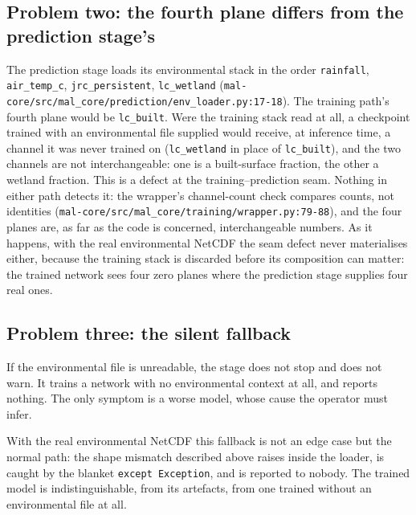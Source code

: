\documentclass[11pt,a4paper]{article}
\newcommand{\codex}[1]{\texttt{#1}}
\begin{document}
\subsection{Problem two: the fourth plane differs from the prediction stage's}

The prediction stage loads its environmental stack in the order
\codex{rainfall}, \codex{air\_\allowbreak{}temp\_\allowbreak{}c}, \codex{jrc\_\allowbreak{}persistent},
\codex{lc\_\allowbreak{}wetland}
(\codex{mal-core/\allowbreak{}src/\allowbreak{}mal\_\allowbreak{}core/\allowbreak{}prediction/\allowbreak{}env\_\allowbreak{}loader.py:17-18}). The training
path's fourth plane would be \codex{lc\_\allowbreak{}built}. Were the training stack read
at all, a checkpoint trained with an environmental file supplied would
receive, at inference time, a channel it was never trained on
(\codex{lc\_\allowbreak{}wetland} in place of \codex{lc\_\allowbreak{}built}), and the two
channels are not interchangeable: one is a built-surface fraction, the
other a wetland fraction. This is a defect at the training--prediction seam.
Nothing in either path detects it: the wrapper's channel-count check compares
counts, not identities (\codex{mal-core/\allowbreak{}src/\allowbreak{}mal\_\allowbreak{}core/\allowbreak{}training/\allowbreak{}wrapper.py:79-88}),
and the four planes are, as far as the code is concerned, interchangeable
numbers. As it happens, with the real environmental NetCDF the seam defect
never materialises either, because the training stack is discarded before
its composition can matter: the trained network sees four zero planes where
the prediction stage supplies four real ones.

\subsection{Problem three: the silent fallback}

If the environmental file is unreadable, the stage does not stop and does not
warn. It trains a network with no environmental context at all, and reports
nothing. The only symptom is a worse model, whose cause the operator must
infer.

With the real environmental NetCDF this fallback is not an edge case but the
normal path: the shape mismatch described above raises inside the loader,
is caught by the blanket \codex{except Exception}, and is reported to
nobody. The trained model is indistinguishable, from its artefacts, from one
trained without an environmental file at all.
\end{document}
